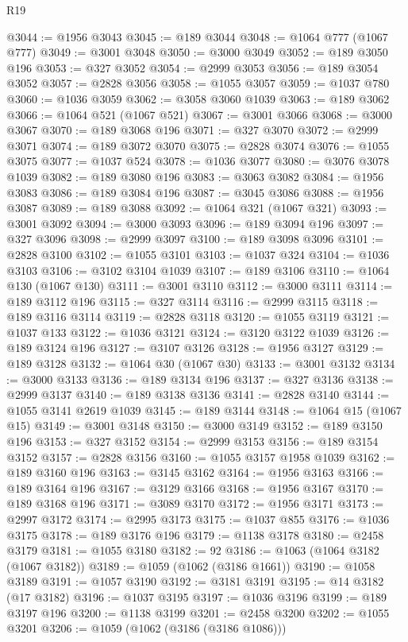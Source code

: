\begin{lexlean}{R19}
\begin{coremodule}
@3044 := @1956 @3043
@3045 := @189 @3044
@3048 := @1064 @777 (@1067 @777)
@3049 := @3001 @3048
@3050 := @3000 @3049
@3052 := @189 @3050 @196
@3053 := @327 @3052
@3054 := @2999 @3053
@3056 := @189 @3054 @3052
@3057 := @2828 @3056
@3058 := @1055 @3057
@3059 := @1037 @780
@3060 := @1036 @3059
@3062 := @3058 @3060 @1039
@3063 := @189 @3062
@3066 := @1064 @521 (@1067 @521)
@3067 := @3001 @3066
@3068 := @3000 @3067
@3070 := @189 @3068 @196
@3071 := @327 @3070
@3072 := @2999 @3071
@3074 := @189 @3072 @3070
@3075 := @2828 @3074
@3076 := @1055 @3075
@3077 := @1037 @524
@3078 := @1036 @3077
@3080 := @3076 @3078 @1039
@3082 := @189 @3080 @196
@3083 := @3063 @3082
@3084 := @1956 @3083
@3086 := @189 @3084 @196
@3087 := @3045 @3086
@3088 := @1956 @3087
@3089 := @189 @3088
@3092 := @1064 @321 (@1067 @321)
@3093 := @3001 @3092
@3094 := @3000 @3093
@3096 := @189 @3094 @196
@3097 := @327 @3096
@3098 := @2999 @3097
@3100 := @189 @3098 @3096
@3101 := @2828 @3100
@3102 := @1055 @3101
@3103 := @1037 @324
@3104 := @1036 @3103
@3106 := @3102 @3104 @1039
@3107 := @189 @3106
@3110 := @1064 @130 (@1067 @130)
@3111 := @3001 @3110
@3112 := @3000 @3111
@3114 := @189 @3112 @196
@3115 := @327 @3114
@3116 := @2999 @3115
@3118 := @189 @3116 @3114
@3119 := @2828 @3118
@3120 := @1055 @3119
@3121 := @1037 @133
@3122 := @1036 @3121
@3124 := @3120 @3122 @1039
@3126 := @189 @3124 @196
@3127 := @3107 @3126
@3128 := @1956 @3127
@3129 := @189 @3128
@3132 := @1064 @30 (@1067 @30)
@3133 := @3001 @3132
@3134 := @3000 @3133
@3136 := @189 @3134 @196
@3137 := @327 @3136
@3138 := @2999 @3137
@3140 := @189 @3138 @3136
@3141 := @2828 @3140
@3144 := @1055 @3141 @2619 @1039
@3145 := @189 @3144
@3148 := @1064 @15 (@1067 @15)
@3149 := @3001 @3148
@3150 := @3000 @3149
@3152 := @189 @3150 @196
@3153 := @327 @3152
@3154 := @2999 @3153
@3156 := @189 @3154 @3152
@3157 := @2828 @3156
@3160 := @1055 @3157 @1958 @1039
@3162 := @189 @3160 @196
@3163 := @3145 @3162
@3164 := @1956 @3163
@3166 := @189 @3164 @196
@3167 := @3129 @3166
@3168 := @1956 @3167
@3170 := @189 @3168 @196
@3171 := @3089 @3170
@3172 := @1956 @3171
@3173 := @2997 @3172
@3174 := @2995 @3173
@3175 := @1037 @855
@3176 := @1036 @3175
@3178 := @189 @3176 @196
@3179 := @1138 @3178
@3180 := @2458 @3179
@3181 := @1055 @3180
@3182 := 92
@3186 := @1063 (@1064 @3182 (@1067 @3182))
@3189 := @1059 (@1062 (@3186 @1661))
@3190 := @1058 @3189
@3191 := @1057 @3190
@3192 := @3181 @3191
@3195 := @14 @3182 (@17 @3182)
@3196 := @1037 @3195
@3197 := @1036 @3196
@3199 := @189 @3197 @196
@3200 := @1138 @3199
@3201 := @2458 @3200
@3202 := @1055 @3201
@3206 := @1059 (@1062 (@3186 (@3186 @1086)))

\end{coremodule}
\end{lexlean}
